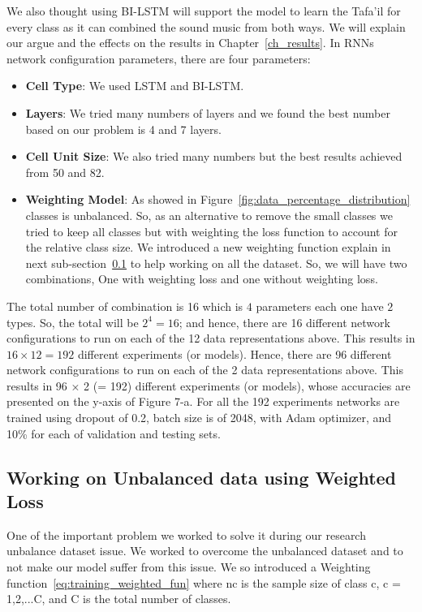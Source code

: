 We also thought using BI-LSTM will support the model to learn the Tafa'il for every class as it can combined the sound music from both ways. We will explain our argue and the effects on the results in Chapter~\ref{ch_results}.
In RNNs network configuration parameters, there are four parameters:
\begin{itemize}
\item \textbf{Cell Type}: We used LSTM and BI-LSTM.
\item \textbf{Layers}: We tried many numbers of layers and we found the best number based on our problem is 4 and 7 layers.
\item \textbf{Cell Unit Size}: We also tried many numbers but the best results achieved from 50 and 82.
\item \textbf{Weighting Model}: As showed in Figure~\ref{fig:data_percentage_distribution} classes is unbalanced. So, as an alternative to remove the small classes we tried to keep all classes but with weighting the loss function to account for the relative class size. We introduced a new weighting function explain in next sub-section~\ref{sec_w_loss} to help working on all the dataset. So, we will have two combinations, One with weighting loss and one without weighting loss.
  
\end{itemize}

The total number of combination is 16 which is $4$ parameters each one have $2$ types. So, the total will be $2^4=16$; and hence, there are 16 different network configurations to run on each of the 12 data representations above. This results in $16 \times 12 = 192$ different experiments (or models). Hence, there are 96 different network configurations to run on each of the 2 data representations above. This results in 96 × 2 (= 192) different experiments (or models), whose accuracies are presented on the y-axis of Figure 7-a.%
For all the 192 experiments networks are trained using dropout of 0.2, batch size is of 2048, with Adam optimizer, and 10\% for each of validation and testing sets.


\newpage
\subsection{Working on Unbalanced data using Weighted Loss}\label{sec_w_loss}

One of the important problem we worked to solve it during our research unbalance dataset issue. We worked to overcome the unbalanced dataset and to not make our model suffer from this issue. We so introduced a Weighting function~\ref{eq:training_weighted_fun} where nc is the sample size of class c, c = 1,2,...C, and C
is the total number of classes.

